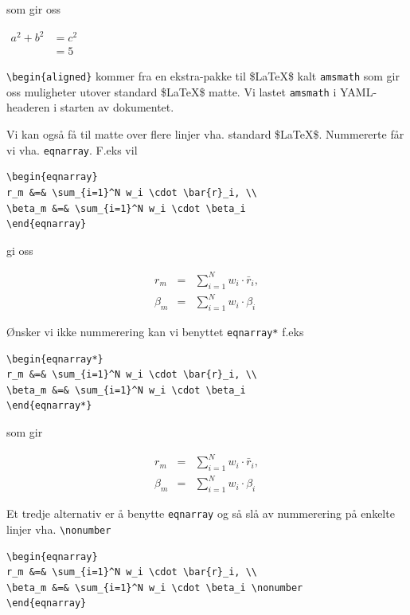 \documentclass[
]{article}
\begin{document}
som gir oss

\begin{math}
\begin{aligned}
a^2 + b^2 &= c^2 \\ &= 5
\end{aligned}
\end{math}

\texttt{\textbackslash{}begin\{aligned\}} kommer fra en ekstra-pakke til
\$\LaTeX \$ kalt \texttt{amsmath} som gir oss muligheter utover standard
\$\LaTeX \$ matte. Vi lastet \texttt{amsmath} i YAML-headeren i starten
av dokumentet.

Vi kan også få til matte over flere linjer vha. standard \$\LaTeX \$.
Nummererte får vi vha. \texttt{eqnarray}. F.eks vil

\begin{verbatim}
\begin{eqnarray}
r_m &=& \sum_{i=1}^N w_i \cdot \bar{r}_i, \\
\beta_m &=& \sum_{i=1}^N w_i \cdot \beta_i
\end{eqnarray}
\end{verbatim}

gi oss

\begin{eqnarray}
r_m &=& \sum_{i=1}^N w_i \cdot \bar{r}_i, \\
\beta_m &=& \sum_{i=1}^N w_i \cdot \beta_i
\end{eqnarray}

Ønsker vi ikke nummerering kan vi benyttet \texttt{eqnarray*} f.eks

\begin{verbatim}
\begin{eqnarray*}
r_m &=& \sum_{i=1}^N w_i \cdot \bar{r}_i, \\
\beta_m &=& \sum_{i=1}^N w_i \cdot \beta_i
\end{eqnarray*}
\end{verbatim}

som gir

\begin{eqnarray*}
r_m &=& \sum_{i=1}^N w_i \cdot \bar{r}_i, \\
\beta_m &=& \sum_{i=1}^N w_i \cdot \beta_i
\end{eqnarray*}

Et tredje alternativ er å benytte \texttt{eqnarray} og så slå av
nummerering på enkelte linjer vha. \texttt{\textbackslash{}nonumber}

\begin{verbatim}
\begin{eqnarray}
r_m &=& \sum_{i=1}^N w_i \cdot \bar{r}_i, \\
\beta_m &=& \sum_{i=1}^N w_i \cdot \beta_i \nonumber
\end{eqnarray}
\end{verbatim}
\end{document}
